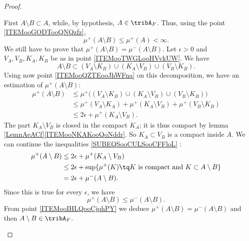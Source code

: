 \begin{proof}
\begin{subproof}
		     \label{ITEMooDSKEooPQmrcW}

		First \( A\setminus B\subset A\), while, by hypothesis, \( A\in \tribA_F\). Thus, using the point \ref{ITEMooGODTooQNQzfz},
		\begin{equation}
			\mu^+(A\setminus B)\leq \mu^+(A)<\infty.
		\end{equation}
		We still have to prove that \( \mu^+(A\setminus B)=\mu^-(A\setminus B)\). Let \( \epsilon>0\) and \( V_A,V_B,K_A,K_B\) be as in point \ref{ITEMooTWGLooHVvkUW}. We have
		\begin{equation}
			A\setminus B\subset (V_A\setminus K_B)\cup (K_A\setminus V_B)\cup(V_B\setminus K_B).
		\end{equation}
		Using now point \ref{ITEMooQZTEooJhWFna} on this decomposition, we have an estimation of \( \mu^+(A\setminus B)\):
		\begin{subequations}        \label{SUBEQSooCULSooCFFloL}
			\begin{align}
				\mu^+(A\setminus B) & \leq \mu^+\Big( (V_A\setminus K_B)\cup (K_A\setminus V_B)\cup(V_B\setminus K_B) \Big) \\
				                    & \leq \mu^+(V_A\setminus K_A)+\mu^+(K_A\setminus V_B)+\mu^+(V_B\setminus K_B)          \\
				                    & \leq 2\epsilon+\mu^+(K_A\setminus V_B).
			\end{align}
		\end{subequations}
		The part \( K_A\setminus V_B\) is closed in the compact \( K_A\); it is thus compact by lemma \ref{LemnAeACf}\ref{ITEMooNKAKooQoNddr}. So \( K_A\subset V_B\) is a compact inside \( A\). We can continue the inequalities \eqref{SUBEQSooCULSooCFFloL} :
		\begin{subequations}
			\begin{align}
				\mu^+(A\setminus B) & \leq 2\epsilon+\mu^+(K_A\setminus V_B)                                                       \\
				                    & \leq 2\epsilon+\sup\{ \mu^+(K)\tq \text{\( K\) is compact and \( K\subset A\setminus B\)} \} \\
				                    & =2\epsilon+\mu^-(A\setminus B).
			\end{align}
		\end{subequations}
		Since this is true for every \( \epsilon\), we have
		\begin{equation}
			\mu^+(A\setminus B)\leq \mu^-(A\setminus B).
		\end{equation}
		From point \ref{ITEMooIHLQooCjqhPY} we deduce \( \mu^+(A\setminus B)=\mu^-(A\setminus B)\) and then \( A\setminus B\in \tribA_F\).


\end{subproof}
\end{proof}
